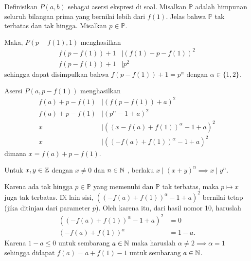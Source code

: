 
\begin{solusi}
    Definisikan $P(a,b)$ sebagai asersi ekspresi di soal. Misalkan $\mathbb{P}$ adalah himpunan seluruh bilangan prima yang bernilai lebih dari $f(1)$. Jelas bahwa $\mathbb{P}$ tak terbatas dan tak hingga. Misalkan $p \in \mathbb{P}$.

    Maka, $P(p-f(1),1)$ menghasilkan 
    \begin{align*}
        f(p-f(1))+1 &\mid (f(1)+p-f(1))^2\\
        f(p-f(1))+1 &\mid p^2
    \end{align*}
    sehingga dapat disimpulkan bahwa $f(p-f(1))+1 = p^\alpha$ dengan $\alpha \in \{1,2\}$.

    Asersi $P(a, p-f(1))$ menghasilkan
    \begin{align*}
        f(a)+p-f(1) &\mid (f(p-f(1))+a)^2\\
        f(a)+p-f(1) &\mid (p^\alpha-1+a)^2\\
        x &\mid ((x-f(a)+f(1))^\alpha-1+a)^2\\
        x &\mid ((-f(a)+f(1))^\alpha-1+a)^2
    \end{align*}
    dimana $x=f(a)+p-f(1)$.

    \begin{remark*}
        Untuk $x,y \in \mathbb Z$ dengan $x \neq 0$ dan $n \in \mathbb N$ , berlaku $x \mid (x+y)^n \implies x \mid y^n$.
    \end{remark*}
    
    Karena ada tak hingga $p \in \mathbb{P}$ yang memenuhi dan $\mathbb{P}$ tak terbatas, maka $p \mapsto x$ juga tak terbatas. Di lain sisi, $((-f(a)+f(1))^\alpha-1+a)^2$ bernilai tetap (jika ditinjau dari parameter $p$). Oleh karena itu, dari hasil nomor 10, haruslah \begin{align*}
        ((-f(a)+f(1))^\alpha-1+a)^2&=0\\
        (-f(a)+f(1))^\alpha &= 1-a.
    \end{align*}
    Karena $1-a \le 0$ untuk sembarang $a \in \mathbb N$ maka haruslah $\alpha \neq 2 \implies \alpha = 1$ sehingga didapat $\boxed{f(a) = a+f(1)-1}$ untuk sembarang $a \in \mathbb N$.   
\end{solusi}